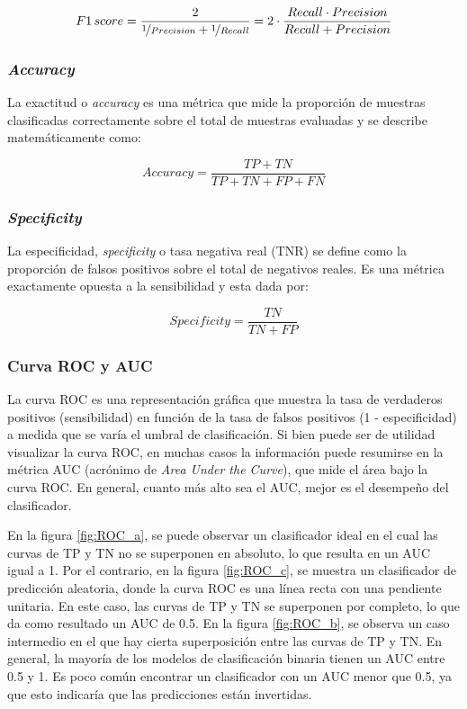 \begin{equation}
	\label{eq:f1score}
	F1\,score = \frac{2}{\nicefrac{1}{Precision} + \nicefrac{1}{Recall}} = 2\cdot\frac{Recall \cdot Precision}{Recall + Precision}
\end{equation}

\subsubsection{\emph{Accuracy}}
La exactitud o \emph{accuracy} es una métrica que mide la proporción de muestras clasificadas correctamente 
sobre el total de muestras evaluadas y se describe matemáticamente como:

\begin{equation}
	\label{eq:accuracy}
	Accuracy = \frac{TP + TN}{TP + TN + FP + FN}
\end{equation}

\subsubsection{\emph{Specificity}}
La especificidad, \emph{specificity} o tasa negativa real (TNR) se define como la proporción de falsos positivos 
sobre el total de negativos reales. Es una métrica exactamente opuesta a la sensibilidad y esta dada por:

\begin{equation}
	\label{eq:specificity}
	Specificity = \frac{TN}{TN + FP}
\end{equation}


\subsubsection{Curva ROC y AUC}
La curva ROC es una representación gráfica que muestra la tasa de verdaderos positivos (sensibilidad)
en función de la tasa de falsos positivos (1 - especificidad) a medida que se varía el umbral de 
clasificación. Si bien puede ser de utilidad visualizar la curva ROC, en muchas casos la información 
puede resumirse en la métrica AUC (acrónimo de \emph{Area Under the Curve}), que mide el área bajo la curva 
ROC. En general, cuanto más alto sea el AUC, mejor es el desempeño del clasificador. 

En la figura \ref{fig:ROC_a}, se puede observar un clasificador ideal en el cual las curvas de TP y TN no se 
superponen en absoluto, lo que resulta en un AUC igual a 1. Por el contrario, en la figura \ref{fig:ROC_c}, 
se muestra un clasificador de predicción aleatoria, donde la curva ROC es una línea recta con una pendiente unitaria. 
En este caso, las curvas de TP y TN se superponen por completo, lo que da como resultado un AUC de 0.5. 
En la figura \ref{fig:ROC_b}, se observa un caso intermedio en el que hay cierta superposición entre las curvas 
de TP y TN. En general, la mayoría de los modelos de clasificación binaria tienen un AUC entre 0.5 y 1. Es poco 
común encontrar un clasificador con un AUC menor que 0.5, ya que esto indicaría que las predicciones están invertidas.

